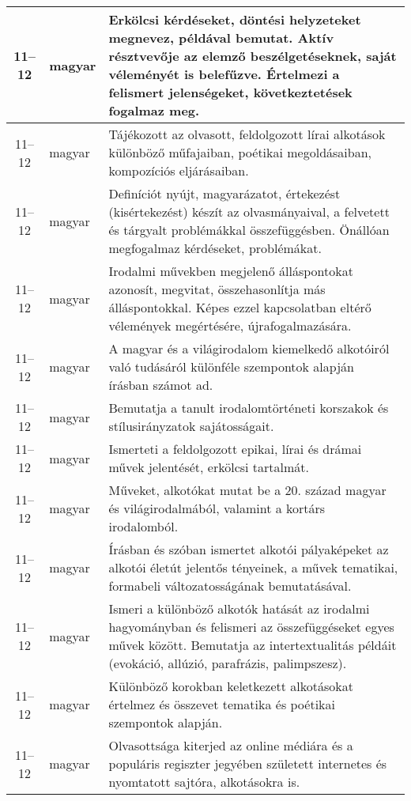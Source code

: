 \begin{small}
\begin{longtable}{c | p{2cm} |  p{11cm} }
              11--12 & magyar & Erkölcsi kérdéseket, döntési helyzeteket megnevez, példával bemutat. Aktív résztvevője az elemző beszélgetéseknek, saját véleményét is belefűzve. Értelmezi a felismert jelenségeket, következtetések fogalmaz meg. \\ \hline
              11--12 & magyar & Tájékozott az olvasott, feldolgozott lírai alkotások különböző műfajaiban, poétikai megoldásaiban, kompozíciós eljárásaiban. \\ \hline
              11--12 & magyar & Definíciót nyújt, magyarázatot, értekezést (kisértekezést) készít az olvasmányaival, a felvetett  és tárgyalt problémákkal összefüggésben. Önállóan megfogalmaz kérdéseket, problémákat. \\ \hline
              11--12 & magyar & Irodalmi művekben megjelenő álláspontokat azonosít, megvitat, összehasonlítja más álláspontokkal. Képes ezzel kapcsolatban eltérő vélemények megértésére, újrafogalmazására. \\ \hline
              11--12 & magyar & A magyar és a világirodalom kiemelkedő alkotóiról való tudásáról különféle szempontok alapján írásban számot ad.
 \\ \hline
              11--12 & magyar & Bemutatja a tanult irodalomtörténeti korszakok és stílusirányzatok sajátosságait. \\ \hline
              11--12 & magyar & Ismerteti a feldolgozott epikai, lírai és drámai művek jelentését, erkölcsi tartalmát. \\ \hline
              11--12 & magyar & Műveket, alkotókat mutat be a 20. század magyar és világirodalmából, valamint a kortárs irodalomból. \\ \hline
              11--12 & magyar & Írásban és szóban ismertet alkotói pályaképeket az alkotói életút jelentős tényeinek, a művek tematikai, formabeli változatosságának bemutatásával. \\ \hline
              11--12 & magyar & Ismeri a különböző alkotók hatását az irodalmi hagyományban és felismeri az összefüggéseket egyes művek között. Bemutatja az intertextualitás példáit (evokáció, allúzió, parafrázis, palimpszesz). \\ \hline
              11--12 & magyar & Különböző korokban keletkezett alkotásokat értelmez és összevet tematika és poétikai szempontok alapján. \\ \hline
              11--12 & magyar & Olvasottsága kiterjed az online médiára és a populáris regiszter jegyében született internetes és nyomtatott sajtóra, alkotásokra is. \\ \hline

\end{longtable}
\end{small}
